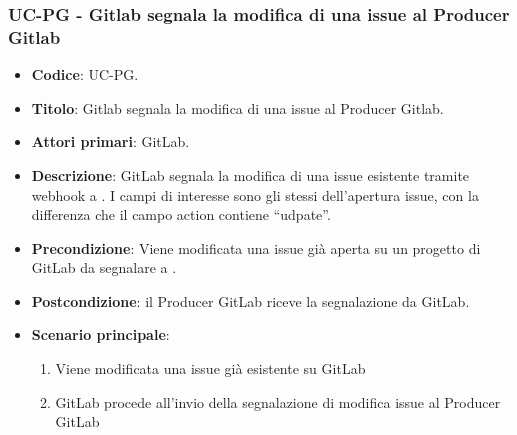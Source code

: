 	\subsubsection{UC\theuccount-PG - Gitlab segnala la modifica di una issue al Producer Gitlab}
	\begin{itemize}
		\item \textbf{Codice}: UC\theuccount-PG.
		\item \textbf{Titolo}: Gitlab segnala la modifica di una issue al Producer Gitlab.
		\item \textbf{Attori primari}: GitLab.
		\item \textbf{Descrizione}: GitLab segnala la modifica di una issue esistente tramite webhook a
		\newline \progetto.
		I campi di interesse sono gli stessi dell'apertura issue, con la differenza che il campo action contiene ``udpate''.
		\item \textbf{Precondizione}: Viene modificata una issue già aperta su un
		progetto di GitLab da segnalare a \progetto.
		\item \textbf{Postcondizione}: il Producer GitLab riceve la segnalazione da GitLab.
		\item \textbf{Scenario principale}: 
		\begin{enumerate}
			\item Viene modificata una issue già esistente su GitLab
			\item GitLab procede all'invio della segnalazione di modifica issue al Producer GitLab
		\end{enumerate}
		
	\end{itemize}